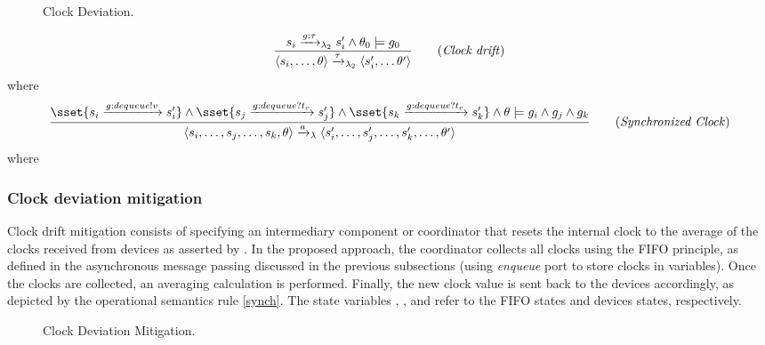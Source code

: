 \noindent
\begin{figure*}[!htb]
    \centering
    
    \caption{Clock Deviation.}
    \label{fig:conne:drift}
\end{figure*} 
\begin{boxD}
	      \begin{equation} \label{unsynch}\frac{ s_{i} \xrightarrow{g:\tau}_{\lambda_{2}} {s'_{i}} \wedge \theta_{0} \models g_{0} } { \langle s_{i}, \ldots,\theta\rangle \xrightarrow{\tau}_{\lambda_{2}}\langle s'_{i}, \ldots\theta'\rangle}   \tag{\emph{Clock drift}} \end{equation} where 
	      \begin{equation}\label{synch}\frac{ \sset{s_{i} \xrightarrow{g:dequeue!v}s'_{i}} \wedge \sset{s_{j} \xrightarrow{g:dequeue?t_{c}} {s'_{j}}}  \wedge \sset{s_{k} \xrightarrow{g:dequeue?t_{c}} {s'_{k}}} \wedge \theta \models g_{i} \wedge g_{j} \wedge g_{k} } { \langle s_{i},\ldots,s_{j}, \ldots,s_{k},\theta\rangle \xrightarrow{a}_{\lambda}\langle s'_{i},\ldots,s'_{j}, \ldots,s'_{k}, \ldots,\theta'\rangle  } \tag{\emph{Synchronized Clock}} \end{equation} where 
\end{boxD}
\subsubsection{Clock deviation mitigation}

Clock drift mitigation consists of specifying an intermediary component or coordinator that resets the internal clock to the average of the clocks received from devices as asserted by \cite{WebsterBDFM18}. In the proposed approach, the coordinator collects all clocks using the FIFO principle, as defined in the asynchronous message passing discussed in the previous subsections (using \emph{enqueue} port to store clocks in variables). Once the clocks are collected, an averaging calculation is performed. Finally, the new clock value is sent back to the devices accordingly, as depicted by the operational semantics rule \ref{synch}. The state variables , , and  refer to the FIFO states and devices states, respectively.
 \noindent
\begin{figure*}[!htb]
    \centering
    
    \caption{Clock Deviation Mitigation.}
    \label{fig:conne:drift:syncro}
\end{figure*} 



